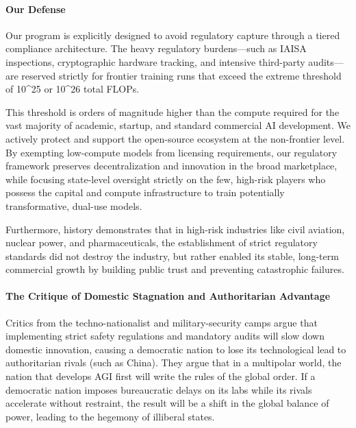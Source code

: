 \paragraph{Our Defense}\label{our-defense}

Our program is explicitly designed to avoid regulatory capture through a
tiered compliance architecture. The heavy regulatory burdens---such as
IAISA inspections, cryptographic hardware tracking, and intensive
third-party audits---are reserved strictly for frontier training runs
that exceed the extreme threshold of 10\^{}25 or 10\^{}26 total FLOPs.

This threshold is orders of magnitude higher than the compute required
for the vast majority of academic, startup, and standard commercial AI
development. We actively protect and support the open-source ecosystem
at the non-frontier level. By exempting low-compute models from
licensing requirements, our regulatory framework preserves
decentralization and innovation in the broad marketplace, while focusing
state-level oversight strictly on the few, high-risk players who possess
the capital and compute infrastructure to train potentially
transformative, dual-use models.

Furthermore, history demonstrates that in high-risk industries like
civil aviation, nuclear power, and pharmaceuticals, the establishment of
strict regulatory standards did not destroy the industry, but rather
enabled its stable, long-term commercial growth by building public trust
and preventing catastrophic failures.

\paragraph{The Critique of Domestic Stagnation and Authoritarian
Advantage}\label{the-critique-of-domestic-stagnation-and-authoritarian-advantage}

Critics from the techno-nationalist and military-security camps argue
that implementing strict safety regulations and mandatory audits will
slow down domestic innovation, causing a democratic nation to lose its
technological lead to authoritarian rivals (such as China). They argue
that in a multipolar world, the nation that develops AGI first will
write the rules of the global order. If a democratic nation imposes
bureaucratic delays on its labs while its rivals accelerate without
restraint, the result will be a shift in the global balance of power,
leading to the hegemony of illiberal states.

